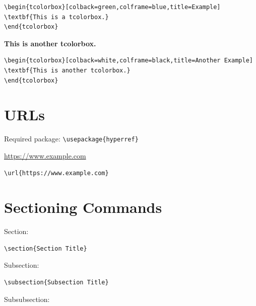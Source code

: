 \documentclass[12pt]{article}
\begin{document}
\begin{verbatim}
\begin{tcolorbox}[colback=green,colframe=blue,title=Example]
\textbf{This is a tcolorbox.}
\end{tcolorbox}
\end{verbatim}

\begin{tcolorbox}[colback=white,colframe=black,title=Another Example]
\textbf{This is another tcolorbox.}
\end{tcolorbox}

\begin{verbatim}
\begin{tcolorbox}[colback=white,colframe=black,title=Another Example]
\textbf{This is another tcolorbox.}
\end{tcolorbox}
\end{verbatim}


\section{URLs}

Required package: \verb|\usepackage{hyperref}|

\url{https://www.example.com}

\begin{verbatim}
\url{https://www.example.com}
\end{verbatim}




\section{Sectioning Commands}

Section:

\begin{verbatim}
\section{Section Title}
\end{verbatim}

Subsection:

\begin{verbatim}
\subsection{Subsection Title}
\end{verbatim}

Subsubsection:
\end{document}

